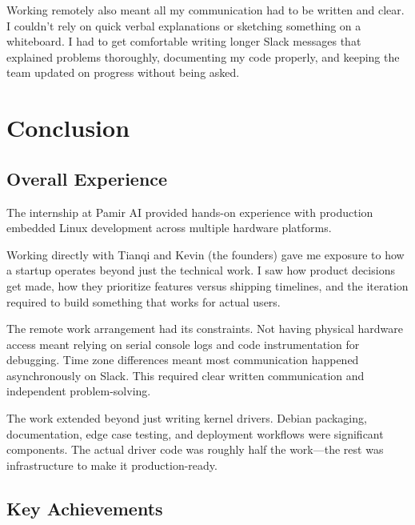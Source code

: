 \documentclass[12pt,a4paper]{report}
\begin{document}
\vspace{0.3cm}

Working remotely also meant all my communication had to be written and clear. I couldn't rely on quick verbal explanations or sketching something on a whiteboard. I had to get comfortable writing longer Slack messages that explained problems thoroughly, documenting my code properly, and keeping the team updated on progress without being asked.

\chapter{Conclusion}

\section{Overall Experience}

The internship at Pamir AI provided hands-on experience with production embedded Linux development across multiple hardware platforms.

\vspace{0.3cm}

Working directly with Tianqi and Kevin (the founders) gave me exposure to how a startup operates beyond just the technical work. I saw how product decisions get made, how they prioritize features versus shipping timelines, and the iteration required to build something that works for actual users.

\vspace{0.3cm}

The remote work arrangement had its constraints. Not having physical hardware access meant relying on serial console logs and code instrumentation for debugging. Time zone differences meant most communication happened asynchronously on Slack. This required clear written communication and independent problem-solving.

\vspace{0.3cm}

The work extended beyond just writing kernel drivers. Debian packaging, documentation, edge case testing, and deployment workflows were significant components. The actual driver code was roughly half the work—the rest was infrastructure to make it production-ready.

\section{Key Achievements}
\end{document}
